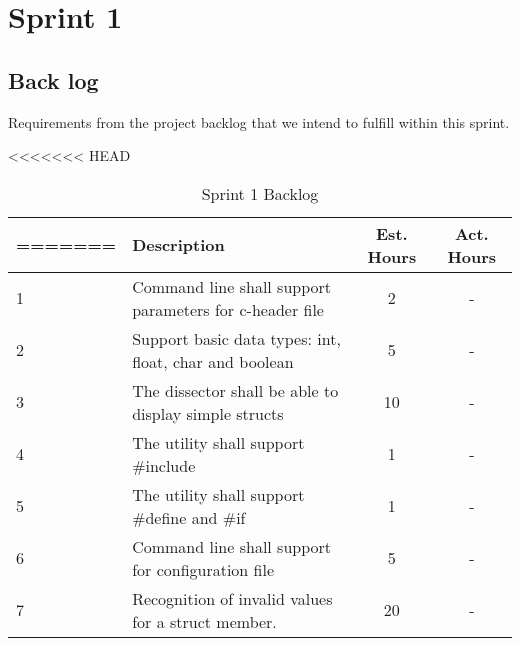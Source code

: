 \chapter{Sprint 1}

\section{Back log}
Requirements from the project backlog that we intend to fulfill within this sprint.

\begin{table}[ht] \center
\caption{Sprint 1 Backlog}
<<<<<<< HEAD
\begin{tabular}{p{1cm} p{6cm} c  c}
=======
\begin{tabular}{p{1cm} p{6cm} p{1cm} p{1cm}}
>>>>>>> 0d4b6db4cab53641589a68840914860de808d29c
	Sprint task & Description & Est. Hours & Act. Hours \\
	\hline
	1 & Command line shall support parameters for c-header file & 2 & -\\
	2 & Support basic data types: int, float, char and boolean & 5 & -\\	
	3 & The dissector shall be able to display simple structs & 10 & -\\
	4 & The utility shall support \#include & 1 & -\\
	5 & The utility shall support \#define and \#if & 1 & -\\	
	6 & Command line shall support for configuration file & 5 & -\\
	7 & Recognition of invalid values for a struct member. & 20 & -\\
\end{tabular}
\end{table}

